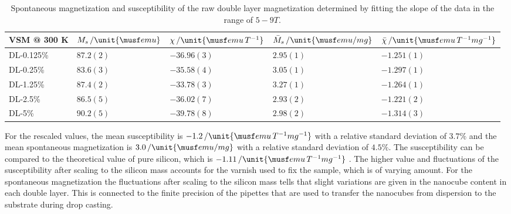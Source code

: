 \documentclass[\main/dresen_thesis.tex]{subfiles}
\begin{document}
    \begin{table}[!htbp]
      \centering
      \caption{\label{tab:doubleLayers:RTVSM:parameters} Spontaneous magnetization and susceptibility of the raw double layer magnetization determined by fitting the slope of the data in the range of $5 - 9 \unit{T}$.}
      \begin{tabular}{ l | l | l || l | l}
        \rule{0pt}{2ex} \textbf{VSM @ 300 K}  & $M_s \, / \unit{\musf emu}$ & $\chi \, / \unit{\musf emu \, T ^{-1}}$ & $\bar{M}_s \, / \unit{\musf emu / mg}$ & $\bar{\chi} \, / \unit{\musf emu \, T ^{-1} mg^{-1}}$ \\
        \hline
        \rule{0pt}{2ex} DL-0.125\%   & $87.2(2)$   & $-36.96(3)$ & $2.95(1)$ & $-1.251(1)$\\
        \rule{0pt}{2ex} DL-0.25\%    & $83.6(3)$   & $-35.58(4)$ & $3.05(1)$ & $-1.297(1)$\\
        \rule{0pt}{2ex} DL-1.25\%    & $87.4(2)$   & $-33.78(3)$ & $3.27(1)$ & $-1.264(1)$\\
        \rule{0pt}{2ex} DL-2.5\%     & $86.5(5)$   & $-36.02(7)$ & $2.93(2)$ & $-1.221(2)$\\
        \rule{0pt}{2ex} DL-5\%       & $90.2(5)$   & $-39.78(8)$ & $2.98(2)$ & $-1.314(3)$\\
        \hline
      \end{tabular}
    \end{table}

    For the rescaled values, the mean susceptibility is $-1.2\, / \unit{\musf emu \, T ^{-1} mg^{-1}}$ with a relative standard deviation of $3.7 \%$  and the mean spontaneous magnetization is $3.0 \, / \unit{\musf emu / mg}$ with a relative standard deviation of $4.5 \%$.
    The susceptibility can be compared to the theoretical value of pure silicon, which is $-1.11\, / \unit{\musf emu \, T ^{-1} mg^{-1}}$ \cite{Lide_2004_Handb}.
    The higher value and fluctuations of the susceptibility after scaling to the silicon mass accounts for the varnish used to fix the sample, which is of varying amount.
    For the spontaneous magnetization the fluctuations after scaling to the silicon mass tells that slight variations are given in the nanocube content in each double layer.
    This is connected to the finite precision of the pipettes that are used to transfer the nanocubes from dispersion to the substrate during drop casting.
\end{document}
